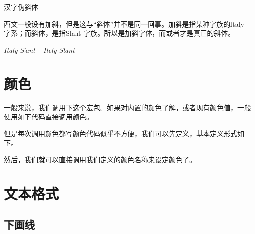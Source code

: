 \begin{latex}{}
{汉字伪斜体}
\end{latex}

西文一般设有加斜，但是这与“斜体”并不是同一回事。加斜是指某种字族的Italy 字系；而斜体，是指Slant 字族。所以是加斜字体，而或者才是真正的斜体。

\begin{center}
	{ \textit{Italy Slant} ~ \textsl{Italy Slant}}
\end{center}

\section{颜色}
一般来说，我们调用下这个宏包。如果对内置的颜色了解，或者现有颜色值，一般使用如下代码直接调用颜色。

\begin{center}
	\color[RGB]{204, 128, 92}{Color Text中文测试}
\end{center}

\begin{latex}{}
\color[RGB]{204, 128, 92}{Color Text中文测试}
\end{latex}

但是每次调用颜色都写颜色代码似乎不方便，我们可以先定义，基本定义形式如下。
\begin{latex}{}
\usepackage{xcolor}									%
\end{latex}

然后，我们就可以直接调用我们定义的颜色名称来设定颜色了。

\begin{center}
\end{center}

\begin{latex}{}
\color{keyword}{\slshape function, return, if, true, false}
\end{latex}

\section{文本格式}

\subsection{下画线}

